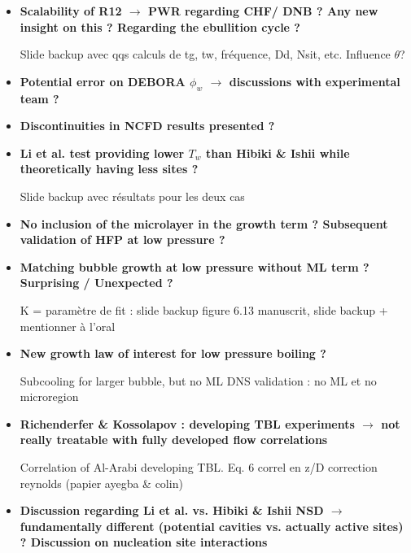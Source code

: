 \documentclass[8pt, a4paper]{article}
\begin{document}
\begin{itemize}
\setlength{\itemsep}{20pt}

\item \textbf{Scalability of R12 $\rightarrow$ PWR regarding CHF/ DNB ? Any new insight on this ? Regarding the ebullition cycle ?}

Slide backup avec qqs calculs de tg, tw, fréquence, Dd, Nsit, etc. Influence $\theta$?



\item \textbf{Potential error on DEBORA $\phi_{w}$ $\rightarrow$ discussions with experimental team ? }


\item \textbf{Discontinuities in NCFD results presented ?}

\item \textbf{Li et al. test providing lower $T_{w}$ than Hibiki \& Ishii while theoretically having less sites ?}

Slide backup avec résultats pour les deux cas


\item \textbf{No inclusion of the microlayer in the growth term ? Subsequent validation of HFP at low pressure ?}



\item \textbf{Matching bubble growth at low pressure without ML term ? Surprising / Unexpected ?}

K = paramètre de fit : slide backup figure 6.13 manuscrit, slide backup + mentionner à l'oral

\item \textbf{New growth law of interest for low pressure boiling ?}

Subcooling for larger bubble, but no ML
DNS validation : no ML et no microregion


\item \textbf{Richenderfer \& Kossolapov : developing TBL experiments $\rightarrow$ not really treatable with fully developed flow correlations}

Correlation of Al-Arabi developing TBL. Eq. 6 correl en z/D correction reynolds (papier ayegba & colin)



\item \textbf{Discussion regarding Li et al. vs. Hibiki \& Ishii NSD $\rightarrow$ fundamentally different (potential cavities vs. actually active sites) ? Discussion on nucleation site interactions}




\end{itemize}
\end{document}
